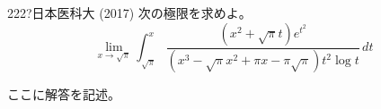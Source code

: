 \begin{prob}{222}{\hosi ?}{日本医科大 (2017)}
 次の極限を求めよ。 \\
 \[ \lim_{x\to\sqrt{\pi}} \int_{\sqrt{\pi}}^x\! \frac{(x^2+\sqrt{\pi}t)e^{t^2}}{(x^3-\sqrt{\pi}x^2+\pi x-\pi\sqrt{\pi})t^2\log t} \,dt \]
\end{prob}
ここに解答を記述。